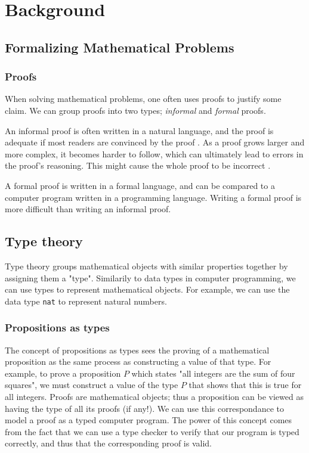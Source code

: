 \chapter{Background}


\section{Formalizing Mathematical Problems}

\subsection{Proofs}

When solving mathematical problems, one often uses proofs
to justify some claim. We can group proofs into two types; \textit{informal} and \textit{formal} proofs.

An informal proof is often written in a natural language, and the proof is adequate if most
readers are convinced by the proof \cite{bpierce}.
As a proof grows larger and more complex, it becomes harder to follow, which can
ultimately lead to errors in the proof's reasoning. This might cause the whole proof
to be incorrect \cite{rkhamsi}.

A formal proof is written in a formal language, and can be compared to a computer program
written in a programming language. Writing a formal proof is more difficult than writing an informal proof.

\section{Type theory}

Type theory groups mathematical objects with similar properties together by assigning them a "type".
Similarily to data types in computer programming, we can use types to represent mathematical
objects. For example, we can use the data type \texttt{nat} to represent natural numbers.

\subsection{Propositions as types}
The concept of propositions as types sees the proving of a mathematical proposition
as the same process as constructing a value of that type.
For example, to prove a proposition $P$ which states "all integers are the sum of four squares",
we must construct a value of the type $P$ that shows that this is true for all integers.
Proofs are mathematical objects; thus a proposition can be viewed as having the type of all its proofs (if any!).
We can use this correspondance to model a proof as a typed computer program.
The power of this concept comes from the fact that we can use a type checker to verify that
our program is typed correctly, and thus that the corresponding proof is valid.


